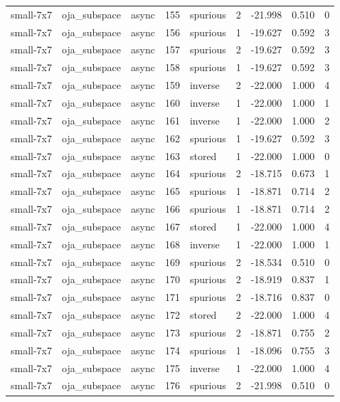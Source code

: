\begin{tabular}{lllrlrrrr}
small-7x7 & oja\_subspace & async & 155 & spurious & 2 & -21.998 & 0.510 & 0 \\
small-7x7 & oja\_subspace & async & 156 & spurious & 1 & -19.627 & 0.592 & 3 \\
small-7x7 & oja\_subspace & async & 157 & spurious & 2 & -19.627 & 0.592 & 3 \\
small-7x7 & oja\_subspace & async & 158 & spurious & 1 & -19.627 & 0.592 & 3 \\
small-7x7 & oja\_subspace & async & 159 & inverse & 2 & -22.000 & 1.000 & 4 \\
small-7x7 & oja\_subspace & async & 160 & inverse & 1 & -22.000 & 1.000 & 1 \\
small-7x7 & oja\_subspace & async & 161 & inverse & 1 & -22.000 & 1.000 & 2 \\
small-7x7 & oja\_subspace & async & 162 & spurious & 1 & -19.627 & 0.592 & 3 \\
small-7x7 & oja\_subspace & async & 163 & stored & 1 & -22.000 & 1.000 & 0 \\
small-7x7 & oja\_subspace & async & 164 & spurious & 2 & -18.715 & 0.673 & 1 \\
small-7x7 & oja\_subspace & async & 165 & spurious & 1 & -18.871 & 0.714 & 2 \\
small-7x7 & oja\_subspace & async & 166 & spurious & 1 & -18.871 & 0.714 & 2 \\
small-7x7 & oja\_subspace & async & 167 & stored & 1 & -22.000 & 1.000 & 4 \\
small-7x7 & oja\_subspace & async & 168 & inverse & 1 & -22.000 & 1.000 & 1 \\
small-7x7 & oja\_subspace & async & 169 & spurious & 2 & -18.534 & 0.510 & 0 \\
small-7x7 & oja\_subspace & async & 170 & spurious & 2 & -18.919 & 0.837 & 1 \\
small-7x7 & oja\_subspace & async & 171 & spurious & 2 & -18.716 & 0.837 & 0 \\
small-7x7 & oja\_subspace & async & 172 & stored & 2 & -22.000 & 1.000 & 4 \\
small-7x7 & oja\_subspace & async & 173 & spurious & 2 & -18.871 & 0.755 & 2 \\
small-7x7 & oja\_subspace & async & 174 & spurious & 1 & -18.096 & 0.755 & 3 \\
small-7x7 & oja\_subspace & async & 175 & inverse & 1 & -22.000 & 1.000 & 4 \\
small-7x7 & oja\_subspace & async & 176 & spurious & 2 & -21.998 & 0.510 & 0 \\

\end{tabular}
